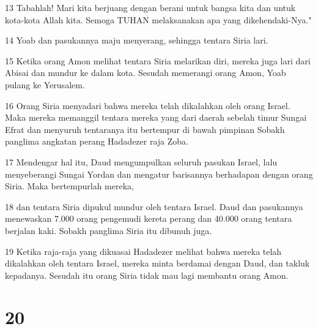 \par 13 Tabahlah! Mari kita berjuang dengan berani untuk bangsa kita dan untuk kota-kota Allah kita. Semoga TUHAN melaksanakan apa yang dikehendaki-Nya."
\par 14 Yoab dan pasukannya maju menyerang, sehingga tentara Siria lari.
\par 15 Ketika orang Amon melihat tentara Siria melarikan diri, mereka juga lari dari Abisai dan mundur ke dalam kota. Sesudah memerangi orang Amon, Yoab pulang ke Yerusalem.
\par 16 Orang Siria menyadari bahwa mereka telah dikalahkan oleh orang Israel. Maka mereka memanggil tentara mereka yang dari daerah sebelah timur Sungai Efrat dan menyuruh tentaranya itu bertempur di bawah pimpinan Sobakh panglima angkatan perang Hadadezer raja Zoba.
\par 17 Mendengar hal itu, Daud mengumpulkan seluruh pasukan Israel, lalu menyeberangi Sungai Yordan dan mengatur barisannya berhadapan dengan orang Siria. Maka bertempurlah mereka,
\par 18 dan tentara Siria dipukul mundur oleh tentara Israel. Daud dan pasukannya menewaskan 7.000 orang pengemudi kereta perang dan 40.000 orang tentara berjalan kaki. Sobakh panglima Siria itu dibunuh juga.
\par 19 Ketika raja-raja yang dikuasai Hadadezer melihat bahwa mereka telah dikalahkan oleh tentara Israel, mereka minta berdamai dengan Daud, dan takluk kepadanya. Sesudah itu orang Siria tidak mau lagi membantu orang Amon.

\chapter{20}

